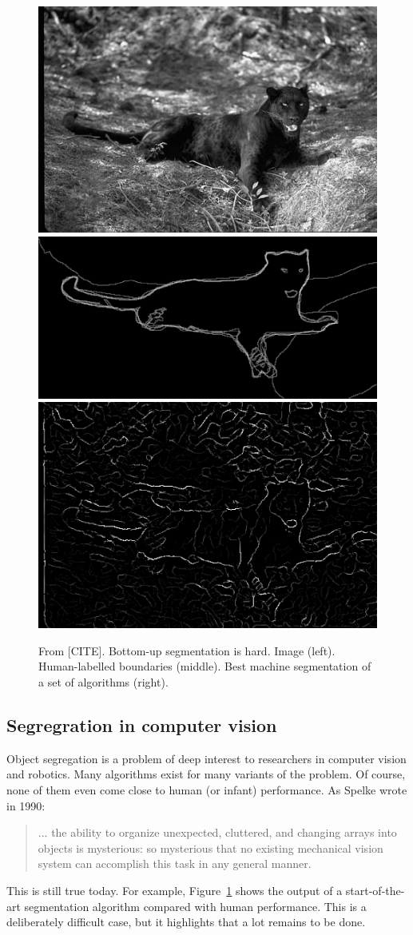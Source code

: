 \begin{figure}[t]

\centerline{
\includegraphics[width=0.3\columnwidth]{cat}
\includegraphics[width=0.3\columnwidth]{cat-human}
\includegraphics[width=0.3\columnwidth]{cat-machine}
}

\caption{
From [CITE].  Bottom-up segmentation is hard.
Image (left).  Human-labelled boundaries (middle).
Best machine segmentation of a set of algorithms (right).
}

\label{fig:segmentation-is-hard}

\end{figure}


\subsection{Segregration in computer vision}

Object segregation is a problem of deep interest to researchers in
computer vision and robotics.  Many algorithms exist for many variants
of the problem.  
Of course, none of them even come close to human (or
infant) performance.  
As Spelke wrote in 1990:

\begin{quote}

... the ability to organize unexpected, cluttered, and
changing arrays into objects is mysterious: so mysterious
that no existing mechanical vision system can accomplish this task
in any general manner.
\cite{spelke90principles}

\end{quote}

\noindent
This is still true today.
For example, Figure~\ref{fig:segmentation-is-hard} shows the
output of a start-of-the-art segmentation algorithm
\cite{martin04learning} compared with human performance.  This is a
deliberately difficult case, but it highlights that a lot remains to
be done.


